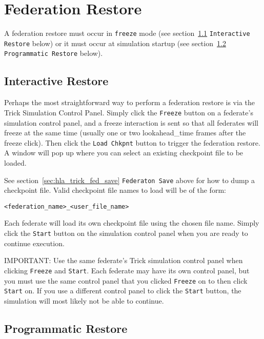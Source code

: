 \chapter{Federation Restore}
\label{sec:hla_trick_fed_restore}

A federation restore must occur in {\tt freeze} mode (see section~\ref{sec:interactive_restore} {\tt Interactive Restore} below)
or it must occur at simulation startup (see section~\ref{sec:prog_restore} {\tt Programmatic Restore}  below).

\section{Interactive Restore }
\label{sec:interactive_restore}

Perhaps the most straightforward way to perform a federation restore is via the Trick Simulation Control Panel.
Simply click the {\tt Freeze} button on a federate's simulation control panel, and a freeze interaction is sent
so that all federates will freeze at the same time (usually one or two lookahead\_time frames after the freeze
click). Then click the {\tt Load Chkpnt} button to trigger the federation restore. A window will pop up where you 
can select an existing checkpoint file to be loaded.

See section~\ref{sec:hla_trick_fed_save} {\tt Federaton Save} above for how to dump a checkpoint file. 
Valid checkpoint file names to load will be of the form:

\begin{verbatim}
<federation_name>_<user_file_name>
\end{verbatim}

Each federate will load its own checkpoint file using the chosen file name.
Simply click the {\tt Start} button on the simulation control panel when you are ready to continue execution.

IMPORTANT: Use the same federate's Trick simulation control panel when clicking {\tt Freeze} and {\tt Start}.
Each federate may have its own control panel, but you must use the same control panel that you clicked {\tt Freeze}
on to then click {\tt Start} on. If you use a different control panel to click the {\tt Start} button, the simulation will most
likely not be able to continue.

\section{Programmatic Restore }
\label{sec:prog_restore}

